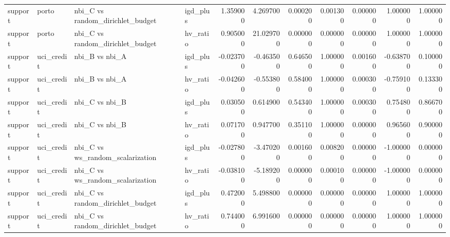 \begin{landscape}
\begin{longtable}{llllrrrrrrr}
support & porto & nbi\_C vs random\_dirichlet\_budget & igd\_plus & 1.359000 & 4.269700 & 0.000200 & 0.001300 & 0.000000 & 1.000000 & 1.000000 \\
support & porto & nbi\_C vs random\_dirichlet\_budget & hv\_ratio & 0.905000 & 21.029700 & 0.000000 & 0.000000 & 0.000000 & 1.000000 & 1.000000 \\
support & uci\_credit & nbi\_B vs nbi\_A & igd\_plus & -0.023700 & -0.463500 & 0.646500 & 1.000000 & 0.001600 & -0.638700 & 0.100000 \\
support & uci\_credit & nbi\_B vs nbi\_A & hv\_ratio & -0.042600 & -0.553800 & 0.584000 & 1.000000 & 0.000300 & -0.759100 & 0.133300 \\
support & uci\_credit & nbi\_C vs nbi\_B & igd\_plus & 0.030500 & 0.614900 & 0.543400 & 1.000000 & 0.000300 & 0.754800 & 0.866700 \\
support & uci\_credit & nbi\_C vs nbi\_B & hv\_ratio & 0.071700 & 0.947700 & 0.351100 & 1.000000 & 0.000000 & 0.965600 & 0.900000 \\
support & uci\_credit & nbi\_C vs ws\_random\_scalarization & igd\_plus & -0.027800 & -3.470200 & 0.001600 & 0.008200 & 0.000000 & -1.000000 & 0.000000 \\
support & uci\_credit & nbi\_C vs ws\_random\_scalarization & hv\_ratio & -0.038100 & -5.189200 & 0.000000 & 0.000100 & 0.000000 & -1.000000 & 0.000000 \\
support & uci\_credit & nbi\_C vs random\_dirichlet\_budget & igd\_plus & 0.472000 & 5.498800 & 0.000000 & 0.000000 & 0.000000 & 1.000000 & 1.000000 \\
support & uci\_credit & nbi\_C vs random\_dirichlet\_budget & hv\_ratio & 0.744000 & 6.991600 & 0.000000 & 0.000000 & 0.000000 & 1.000000 & 1.000000 \\
\end{longtable}\endgroup\addtocounter{table}{-1}

\end{landscape}
